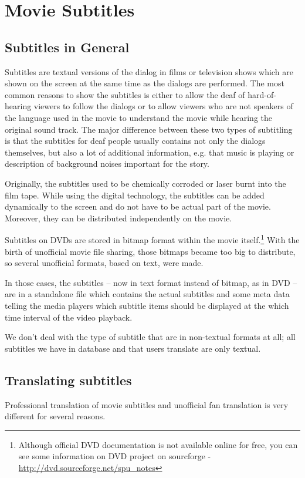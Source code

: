 \section{Movie Subtitles}
\subsection{Subtitles in General}

Subtitles are textual versions of the dialog in films or television shows which are shown on the screen at the same time as the dialogs are performed. The most common reasons to show the subtitles is either to allow the deaf of hard-of-hearing viewers to follow the dialogs or to allow viewers who are not speakers of the language used in the movie to understand the movie while hearing the original sound track. The major difference between these two types of subtitling is that the subtitles for deaf people usually contains not only the dialogs themselves, but also a lot of additional information, e.g. that music is playing or description of background noises important for the story. 

Originally, the subtitles used to be chemically corroded or laser burnt into the film tape. While using the digital technology, the subtitles can be added dynamically to the screen and do not have to be actual part of the movie. Moreover, they can be distributed independently on the movie. 

Subtitles on DVDs are stored in bitmap format within the movie itself.\footnote{Although official DVD documentation is not available online for free, you can see some information on DVD project on sourcforge - \url{http://dvd.sourceforge.net/spu_notes}} With the birth of unofficial movie file sharing, those bitmaps became too big to distribute, so several unofficial formats, based on text, were made.

In those cases, the subtitles -- now in text format instead of bitmap, as in DVD -- are in a standalone file which contains the actual subtitles and some meta data telling the media players which subtitle items should be displayed at the which time interval of the video playback.

We don't deal with the type of subtitle that are in non-textual formats at all; all subtitles we have in database and that users translate are only textual.

\subsection{Translating subtitles}
Professional translation of movie subtitles and unofficial fan translation is very different for several reasons.

